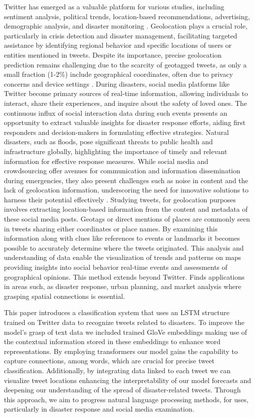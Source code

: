 \documentclass[conference]{IEEEtran}
\begin{document}
Twitter has emerged as a valuable platform for various studies, including sentiment analysis, political trends, location-based recommendations, advertising, demographic analysis, and disaster monitoring \cite{b1}. Geolocation plays a crucial role, particularly in crisis detection and disaster management, facilitating targeted assistance by identifying regional behavior and specific locations of users or entities mentioned in tweets. Despite its importance, precise geolocation prediction remains challenging due to the scarcity of geotagged tweets, as only a small fraction (1-2\%) include geographical coordinates, often due to privacy concerns and device settings \cite{b8}. During disasters, social media platforms like Twitter become primary sources of real-time information, allowing individuals to interact, share their experiences, and inquire about the safety of loved ones. The continuous influx of social interaction data during such events presents an opportunity to extract valuable insights for disaster response efforts, aiding first responders and decision-makers in formulating effective strategies. Natural disasters, such as floods, pose significant threats to public health and infrastructure globally, highlighting the importance of timely and relevant information for effective response measures. While social media and crowdsourcing offer avenues for communication and information dissemination during emergencies, they also present challenges such as noise in content and the lack of geolocation information, underscoring the need for innovative solutions to harness their potential effectively \cite{b12}. Studying tweets, for geolocation \cite{b6} purposes involves extracting location-based information from the content and metadata of these social media posts. Geotags or direct mentions of places are commonly seen in tweets sharing either coordinates or place names. By examining this information along with clues like references to events or landmarks it becomes possible to accurately determine where the tweets originated. This analysis and understanding of data enable the visualization of trends and patterns on maps providing insights into social behavior real-time events and assessments of geographical opinions. This method extends beyond Twitter. Finds applications in areas such, as disaster response, urban planning, and market analysis where grasping spatial connections is essential.

This paper introduces a classification system that uses an LSTM structure trained on Twitter data to recognize tweets related to disasters. To improve the model's grasp of text data we included trained GloVe embeddings making use of the contextual information stored in these embeddings to enhance word representations. By employing transformers our model gains the capability to capture connections, among words, which are crucial for precise tweet classification. Additionally, by integrating data linked to each tweet we can visualize tweet locations enhancing the interpretability of our model forecasts and deepening our understanding of the spread of disaster-related tweets. Through this approach, we aim to progress natural language processing methods, for uses, particularly in disaster response and social media examination.
\end{document}
